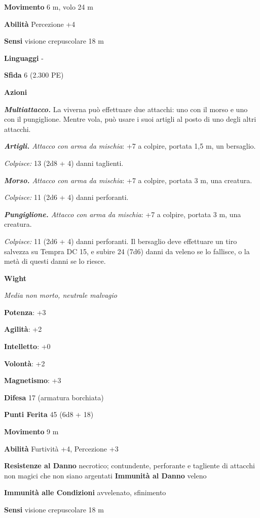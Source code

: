 \begin{multicols}{2}
\textbf{Movimento} 6 m, volo 24 m

\textbf{Abilità} Percezione +4

\textbf{Sensi} visione crepuscolare 18 m

\textbf{Linguaggi} -

\textbf{Sfida} 6 (2.300 PE)

\textbf{Azioni}

\emph{\textbf{Multiattacco.}} La viverna può effettuare due attacchi:
uno con il morso e uno con il pungiglione. Mentre vola, può usare i suoi
artigli al posto di uno degli altri attacchi.

\emph{\textbf{Artigli.} Attacco con arma da mischia}: +7 a colpire,
portata 1,5 m, un bersaglio.

\emph{Colpisce:} 13 (2d8 + 4) danni taglienti.

\emph{\textbf{Morso.} Attacco con arma da mischia}: +7 a colpire,
portata 3 m, una creatura.

\emph{Colpisce:} 11 (2d6 + 4) danni perforanti.

\emph{\textbf{Pungiglione.} Attacco con arma da mischia}: +7 a colpire,
portata 3 m, una creatura.

\emph{Colpisce:} 11 (2d6 + 4) danni perforanti. Il bersaglio deve
effettuare un tiro salvezza su Tempra DC 15, e subire 24 (7d6)
danni da veleno se lo fallisce, o la metà di questi danni se lo riesce.



\textbf{Wight}

\emph{Media non morto, neutrale malvagio}

\textbf{Potenza}: +3

\textbf{Agilità}: +2

\textbf{Intelletto}: +0

\textbf{Volontà}: +2

\textbf{Magnetismo}: +3

\textbf{Difesa} 17 (armatura borchiata)

\textbf{Punti Ferita} 45 (6d8 + 18)

\textbf{Movimento} 9 m

\textbf{Abilità} Furtività +4, Percezione +3

\textbf{Resistenze al Danno} necrotico; contundente, perforante e
tagliente di attacchi non magici che non siano argentati
\textbf{Immunità al Danno} veleno

\textbf{Immunità alle Condizioni} avvelenato, sfinimento

\textbf{Sensi} visione crepuscolare 18 m


\end{multicols}
